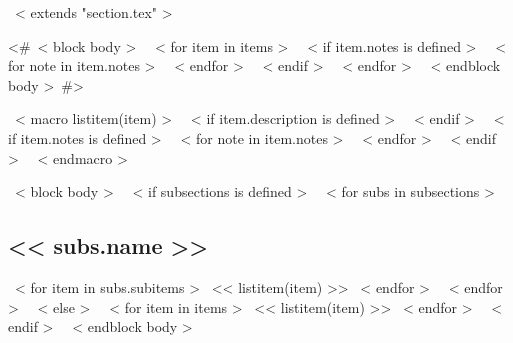 ~< extends "section.tex" >~

<#~< block body >~
  ~< for item in items >~
    ~< if item.notes is defined >~
      ~< for note in item.notes >~
      ~< endfor >~
    ~< endif >~
  ~< endfor >~
~< endblock body >~#>

~< macro listitem(item) >~
  ~< if item.description is defined >~
  ~< endif >~
  ~< if item.notes is defined >~
    ~< for note in item.notes >~
    ~< endfor >~
  ~< endif >~
~< endmacro >~

~< block body >~
  ~< if subsections is defined >~
    ~< for subs in subsections >~
      \subsection{<< subs.name >>}
        ~< for item in subs.subitems >~
          << listitem(item) >>
        ~< endfor >~
    ~< endfor >~
  ~< else >~
    ~< for item in items >~
      << listitem(item) >>
    ~< endfor >~
  ~< endif >~
~< endblock body >~

